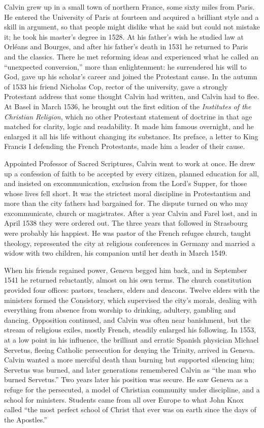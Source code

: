 Calvin grew up in a small town of northern France, some sixty miles from Paris. He entered the University of Paris at
fourteen and acquired a brilliant style and a skill in argument, so that people might dislike what he
said but could not mistake it; he took his master's degree in 1528. At his father's wish he studied
law at Orl\'eans and Bourges, and after his father's death in 1531 he returned to Paris and the
classics. There he met reforming ideas and experienced what he called an ``unexpected conversion,''
more than enlightenment: he surrendered his will to God, gave up his scholar's career and joined the
Protestant cause. In the autumn of 1533 his friend Nicholas Cop, rector of the university, gave a
strongly Protestant address that some thought Calvin had written, and Calvin had to flee. At Basel in March 1536, he brought out the first edition of the \emph{Institutes of the Christian Religion}, which no other Protestant statement of doctrine in that age matched for clarity, logic and readability. It made
him famous overnight, and he enlarged it all his life without changing its substance. Its preface, a
letter to King Francis I defending the French Protestants, made him a leader of their cause.

Appointed Professor of Sacred Scriptures, Calvin went to work at once. He drew up a confession of
faith to be accepted by every citizen, planned education for all, and insisted on excommunication,
exclusion from the Lord's Supper, for those whose lives fell short. It was the strictest moral
discipline in Protestantism and more than the city fathers had bargained for. The dispute turned on
who may excommunicate, church or magistrates. After a year Calvin and Farel lost, and in April 1538
they were ordered out. The three years that followed in Strasbourg were probably his happiest. He was
pastor of the French refugee church, taught theology, represented the city at religious conferences
in Germany and married a widow with two children, his companion until her death in March 1549.

When his friends regained power, Geneva begged him back, and in September 1541 he returned
reluctantly, almost on his own terms. The church constitution provided four offices: pastors,
teachers, elders and deacons. Twelve elders with the ministers formed the Consistory, which
supervised the city's morals, dealing with everything from absence from worship to drinking,
adultery, gambling and dancing. Opposition continued, and Calvin was often near banishment, but the
stream of religious exiles, mostly French, steadily enlarged his following. In 1553, at a low point
in his influence, the brilliant and erratic Spanish physician Michael Servetus, fleeing Catholic
persecution for denying the Trinity, arrived in Geneva. Calvin wanted a more merciful death than
burning but supported silencing him; Servetus was burned, and later generations remembered Calvin as
``the man who burned Servetus.'' Two years later his position was secure. He saw Geneva as a refuge
for the persecuted, a model of Christian community under discipline, and a school for ministers. Students came from all over Europe to what John Knox called ``the most perfect school of
Christ that ever was on earth since the days of the Apostles.''

